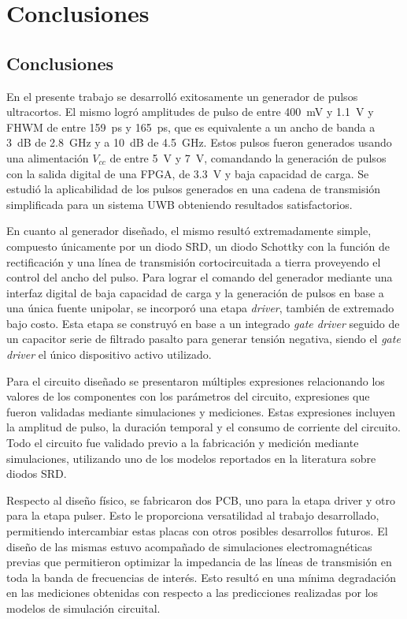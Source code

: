 \chapter{Conclusiones}

\section{Conclusiones}

En el presente trabajo se desarrolló exitosamente un generador de pulsos
ultracortos. El mismo logró amplitudes de pulso de entre \qty{400}{\milli\volt}
y \qty{1.1}{\volt} y FHWM de entre \qty{159}{\pico\second} y
\qty{165}{\pico\second}, que es equivalente a un ancho de banda a \qty{3}{\dB}
de \qty{2.8}{\giga\hertz} y a \qty{10}{\dB} de \qty{4.5}{\giga\hertz}.  Estos
pulsos fueron generados usando una alimentación $V_{cc}$ de entre \qty{5}{\volt}
y \qty{7}{\volt}, comandando la generación de pulsos con la salida digital de
una FPGA, de \qty{3.3}{\volt} y baja capacidad de carga. Se estudió la
aplicabilidad de los pulsos generados en una cadena de transmisión simplificada
para un sistema UWB obteniendo resultados satisfactorios.

En cuanto al generador diseñado, el mismo resultó extremadamente simple,
compuesto únicamente por un diodo SRD, un diodo Schottky con la función de
rectificación y una línea de transmisión cortocircuitada a tierra proveyendo el
control del ancho del pulso. Para lograr el comando del generador mediante una
interfaz digital de baja capacidad de carga y la generación de pulsos en base a
una única fuente unipolar, se incorporó una etapa \textit{driver}, también de
extremado bajo costo. Esta etapa se construyó en base a un integrado
\textit{gate driver} seguido de un capacitor serie de filtrado pasalto para
generar tensión negativa, siendo el \textit{gate driver} el único dispositivo
activo utilizado.

Para el circuito diseñado se presentaron múltiples expresiones relacionando los
valores de los componentes con los parámetros del circuito, expresiones que
fueron validadas mediante simulaciones y mediciones. Estas expresiones incluyen
la amplitud de pulso, la duración temporal y el consumo de corriente del
circuito. Todo el circuito fue validado previo a la fabricación y medición
mediante simulaciones, utilizando uno de los modelos reportados en la literatura
sobre diodos SRD.

Respecto al diseño físico, se fabricaron dos PCB, uno para la etapa driver y
otro para la etapa pulser. Esto le proporciona versatilidad al trabajo
desarrollado, permitiendo intercambiar estas placas con otros posibles
desarrollos futuros. El diseño de las mismas estuvo acompañado de simulaciones
electromagnéticas previas que permitieron optimizar la impedancia de las líneas
de transmisión en toda la banda de frecuencias de interés. Esto resultó en una
mínima degradación en las mediciones obtenidas con respecto a las predicciones
realizadas por los modelos de simulación circuital.

